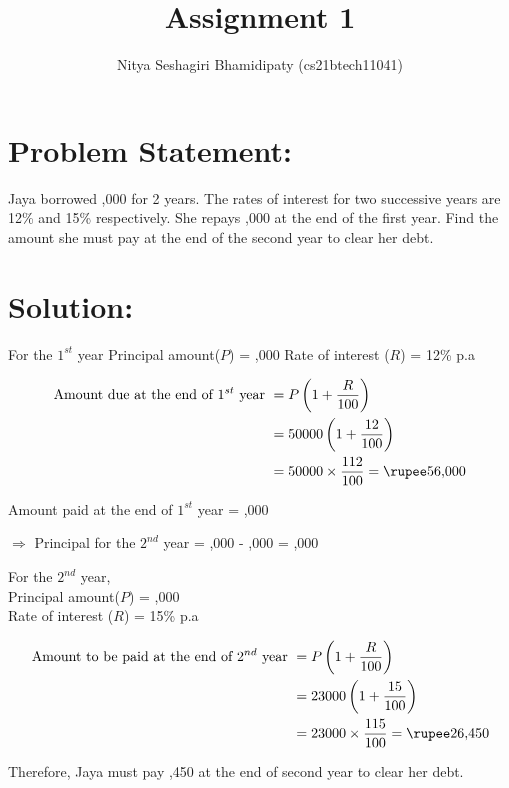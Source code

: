 \documentclass{article}
\title{Assignment 1}
\author{Nitya Seshagiri Bhamidipaty (cs21btech11041)}
\begin{document}
\maketitle
\section*{Problem Statement: }
Jaya borrowed ,000 for 2 years. The rates of interest for two successive years are 12\% and 15\% respectively. She repays ,000 at the end of the first year. Find the amount she must pay at the end of the second year to clear her debt.
\section*{Solution:}
For the $1^{st}$ year\newline
Principal amount($P$) = ,000\newline
Rate of interest  ($R$) = 12\% p.a 

\begin{align*}
      \text{Amount due at the end of $1^{st}$ year }&= P\left(1 + \frac{R}{100}\right)\\
   &= 50000\left(1 + \frac{12}{100}\right)\\
   &= 50000\times \frac{112}{100} = \text{\rupee56,000}
\end{align*}

Amount paid at the end of $1^{st}$ year = ,000


$\Rightarrow$ Principal for the $2^{nd}$ year = ,000 - ,000 = ,000
\vspace{7pt}

For the $2^{nd}$ year,\\
Principal amount($P$) = ,000\\
Rate of interest  ($R$) = 15\% p.a 

\begin{align*}
      \text{Amount to be paid at the end of $2^{nd}$ year }&= P\left(1 + \frac{R}{100}\right)\\
   &= 23000\left(1 + \frac{15}{100}\right)\\
   &= 23000\times \frac{115}{100} = \text{\rupee26,450}
\end{align*}

Therefore, Jaya must pay ,450 at the end of second year to clear her debt.
\end{document}
